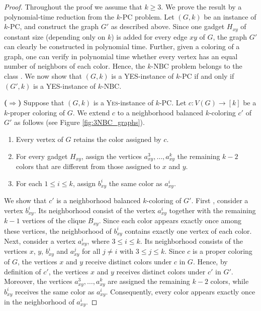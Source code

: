 \documentclass[12pt]{article}
\newcommand{\probNBCshort}{\textsc{$k$-NBC}\xspace}
\newcommand{\yes}{\textsf{YES}\xspace}
\begin{document}
\begin{proof}
Throughout the proof we assume that $k \geq 3$.
We prove the result by a polynomial-time reduction from the \textsc{$k$-PC} problem.
Let $(G,k)$ be an instance of \textsc{$k$-PC}, and construct the graph $G'$ as described above.
Since one gadget $H_{xy}$ of constant size (depending only on $k$) is added for every edge $xy$ of $G$, the graph $G'$ can clearly be constructed in polynomial time.
Further, given a coloring of a graph, one can verify in polynomial time whether every vertex has an equal number of neighbors of each color.
Hence, the \probNBCshort problem belongs to the class \NP.
We now show that $(G,k)$ is a \yes-instance of \textsc{$k$-PC} if and only if $(G',k)$ is a \yes-instance of \probNBCshort.

\medskip

\noindent\textbf{($\Rightarrow$)} Suppose that $(G,k)$ is a \textsc{Yes}-instance of \textsc{$k$-PC}. Let $c:V(G)\rightarrow[k]$
be a $k$-proper coloring of $G$.
We extend $c$ to a neighborhood balanced $k$-coloring $c'$ of $G'$ as follows (see Figure \ref{fig:3NBC_graphs}).

\begin{enumerate}[noitemsep]
\item Every vertex of $G$ retains the color assigned by $c$.

\item For every gadget $H_{xy}$, assign the vertices
$a^{3}_{xy},\ldots,a^{k}_{xy}$ the remaining $k-2$ colors that are different from those assigned to $x$ and $y$.

\item For each $1\le i\le k$, assign $b^{i}_{xy}$ the same color as $a^{i}_{xy}$.
\end{enumerate}

We show that $c'$ is a neighborhood balanced $k$-coloring of $G'$.
First , consider a vertex $b^{i}_{xy}$.
Its neighborhood consist of the vertex $a^{i}_{xy}$ together with the remaining $k-1$ vertices of the clique $B_{xy}$. Since each color appears exactly once among these vertices, the neighborhood of $b^{i}_{xy}$ contains exactly one vertex of each color.
Next, consider a vertex $a^{i}_{xy}$, where $3\le i\le k$. Its neighborhood consists of the vertices  $x$, $y$, $b^{i}_{xy}$ and $a^{j}_{xy}$ for all $j\neq i$ with $3\le j\le k$.
Since $c$ is a proper coloring of $G$, the vertices $x$ and $y$ receive distinct colors under $c$ in $G$.
Hence, by definition of $c'$, the vertices $x$ and $y$ receives distinct colors under $c'$ in $G'$.
Moreover, the vertices $a^{3}_{xy},\ldots ,a^{k}_{xy}$ are assigned the remaining $k-2$ colors, while $b^{i}_{xy}$ receives the same color as $a^{i}_{xy}$.
Consequently, every color appears exactly once in the neighborhood of $a^{i}_{xy}$.


\end{proof}
\end{document}
